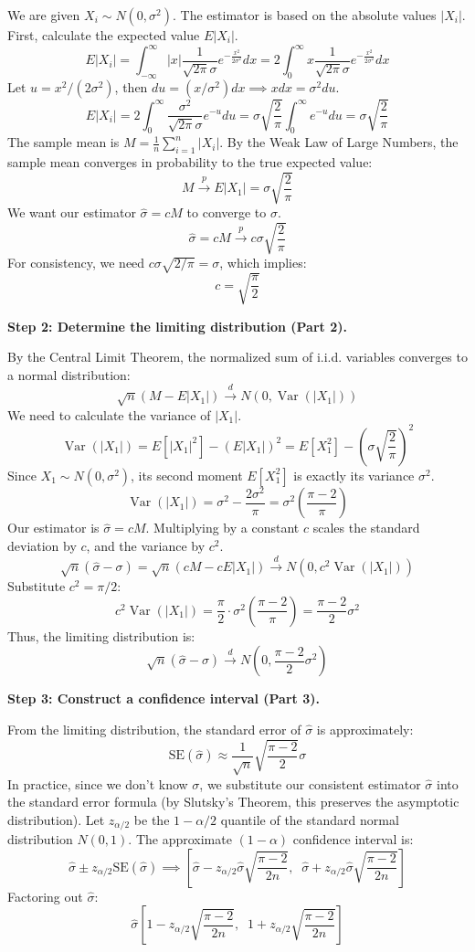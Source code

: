 \begin{solution}
We are given $X_i \sim N(0, \sigma^2)$. The estimator is based on the absolute values $|X_i|$.
First, calculate the expected value $E|X_i|$.
\[ E|X_i| = \int_{-\infty}^\infty |x| \frac{1}{\sqrt{2\pi}\sigma} e^{-\frac{x^2}{2\sigma^2}} dx = 2 \int_{0}^\infty x \frac{1}{\sqrt{2\pi}\sigma} e^{-\frac{x^2}{2\sigma^2}} dx \]
Let $u = x^2 / (2\sigma^2)$, then $du = (x / \sigma^2) dx \implies x dx = \sigma^2 du$.
\[ E|X_i| = 2 \int_{0}^\infty \frac{\sigma^2}{\sqrt{2\pi}\sigma} e^{-u} du = \sigma \sqrt{\frac{2}{\pi}} \int_{0}^\infty e^{-u} du = \sigma \sqrt{\frac{2}{\pi}} \]
The sample mean is $M = \frac{1}{n} \sum_{i=1}^n |X_i|$.
By the Weak Law of Large Numbers, the sample mean converges in probability to the true expected value:
\[ M \xrightarrow{p} E|X_1| = \sigma \sqrt{\frac{2}{\pi}} \]
We want our estimator $\hat{\sigma} = cM$ to converge to $\sigma$.
\[ \hat{\sigma} = cM \xrightarrow{p} c \sigma \sqrt{\frac{2}{\pi}} \]
For consistency, we need $c \sigma \sqrt{2/\pi} = \sigma$, which implies:
\[ c = \sqrt{\frac{\pi}{2}} \]

\textbf{Step 2: Determine the limiting distribution (Part 2).}

By the Central Limit Theorem, the normalized sum of i.i.d. variables converges to a normal distribution:
\[ \sqrt{n}(M - E|X_1|) \xrightarrow{d} N(0, \operatorname{Var}(|X_1|)) \]
We need to calculate the variance of $|X_1|$.
\[ \operatorname{Var}(|X_1|) = E[|X_1|^2] - (E|X_1|)^2 = E[X_1^2] - \left(\sigma \sqrt{\frac{2}{\pi}}\right)^2 \]
Since $X_1 \sim N(0, \sigma^2)$, its second moment $E[X_1^2]$ is exactly its variance $\sigma^2$.
\[ \operatorname{Var}(|X_1|) = \sigma^2 - \frac{2\sigma^2}{\pi} = \sigma^2 \left( \frac{\pi - 2}{\pi} \right) \]
Our estimator is $\hat{\sigma} = cM$. Multiplying by a constant $c$ scales the standard deviation by $c$, and the variance by $c^2$.
\[ \sqrt{n}(\hat{\sigma} - \sigma) = \sqrt{n}(cM - cE|X_1|) \xrightarrow{d} N(0, c^2 \operatorname{Var}(|X_1|)) \]
Substitute $c^2 = \pi/2$:
\[ c^2 \operatorname{Var}(|X_1|) = \frac{\pi}{2} \cdot \sigma^2 \left( \frac{\pi - 2}{\pi} \right) = \frac{\pi - 2}{2} \sigma^2 \]
Thus, the limiting distribution is:
\[ \sqrt{n}(\hat{\sigma} - \sigma) \xrightarrow{d} N\left(0, \frac{\pi - 2}{2} \sigma^2 \right) \]

\textbf{Step 3: Construct a confidence interval (Part 3).}

From the limiting distribution, the standard error of $\hat{\sigma}$ is approximately:
\[ \text{SE}(\hat{\sigma}) \approx \frac{1}{\sqrt{n}} \sqrt{\frac{\pi - 2}{2}} \sigma \]
In practice, since we don't know $\sigma$, we substitute our consistent estimator $\hat{\sigma}$ into the standard error formula (by Slutsky's Theorem, this preserves the asymptotic distribution).
Let $z_{\alpha/2}$ be the $1 - \alpha/2$ quantile of the standard normal distribution $N(0,1)$.
The approximate $(1-\alpha)$ confidence interval is:
\[ \hat{\sigma} \pm z_{\alpha/2} \text{SE}(\hat{\sigma}) \implies \left[ \hat{\sigma} - z_{\alpha/2} \hat{\sigma} \sqrt{\frac{\pi - 2}{2n}}, \;\; \hat{\sigma} + z_{\alpha/2} \hat{\sigma} \sqrt{\frac{\pi - 2}{2n}} \right] \]
Factoring out $\hat{\sigma}$:
\[ \hat{\sigma} \left[ 1 - z_{\alpha/2} \sqrt{\frac{\pi - 2}{2n}}, \;\; 1 + z_{\alpha/2} \sqrt{\frac{\pi - 2}{2n}} \right] \]


\end{solution}
